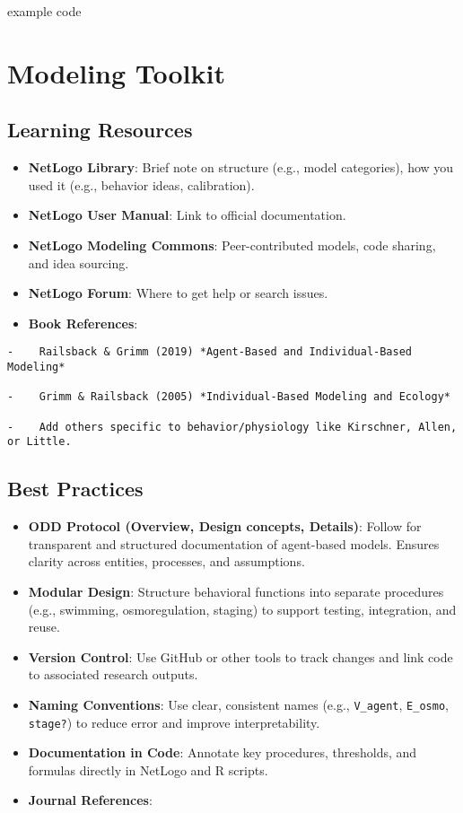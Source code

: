 \documentclass[
]{book}
\providecommand{\tightlist}{%
  \setlength{\itemsep}{0pt}\setlength{\parskip}{0pt}}
\begin{document}
example code

\chapter{Modeling Toolkit}\label{modeling-toolkit}

\section{Learning Resources}\label{learning-resources}

\begin{itemize}
\tightlist
\item
  \textbf{NetLogo Library}: Brief note on structure (e.g., model categories), how you used it (e.g., behavior ideas, calibration).
\item
  \textbf{NetLogo User Manual}: Link to official documentation.
\item
  \textbf{NetLogo Modeling Commons}: Peer-contributed models, code sharing, and idea sourcing.
\item
  \textbf{NetLogo Forum}: Where to get help or search issues.
\item
  \textbf{Book References}:
\end{itemize}

\begin{verbatim}
-    Railsback & Grimm (2019) *Agent-Based and Individual-Based Modeling*

-    Grimm & Railsback (2005) *Individual-Based Modeling and Ecology*

-    Add others specific to behavior/physiology like Kirschner, Allen, or Little.
\end{verbatim}

\section{Best Practices}\label{best-practices}

\begin{itemize}
\item
  \textbf{ODD Protocol (Overview, Design concepts, Details)}: Follow for transparent and structured documentation of agent-based models. Ensures clarity across entities, processes, and assumptions.
\item
  \textbf{Modular Design}: Structure behavioral functions into separate procedures (e.g., swimming, osmoregulation, staging) to support testing, integration, and reuse.
\item
  \textbf{Version Control}: Use GitHub or other tools to track changes and link code to associated research outputs.
\item
  \textbf{Naming Conventions}: Use clear, consistent names (e.g., \texttt{V\_agent}, \texttt{E\_osmo}, \texttt{stage?}) to reduce error and improve interpretability.
\item
  \textbf{Documentation in Code}: Annotate key procedures, thresholds, and formulas directly in NetLogo and R scripts.
\item
  \textbf{Journal References}:
\end{itemize}
\end{document}
